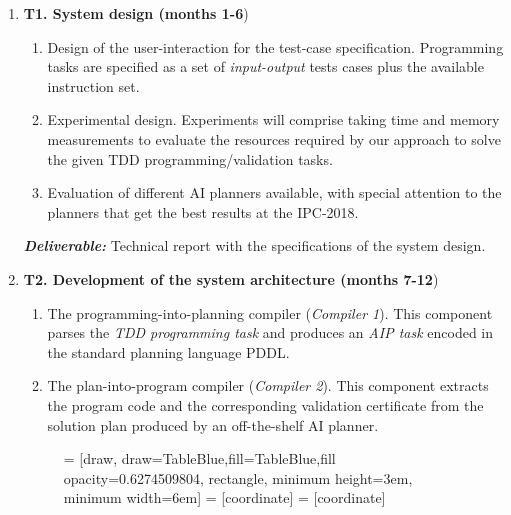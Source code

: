 \documentclass[10pt,a4paper]{paper}
\begin{document}
\begin{enumerate}
\item {\bf T1. System design (months 1-6})
  \begin{small}
    \begin{enumerate}
    \item Design of the user-interaction for the test-case specification. Programming tasks are specified as a set of {\em input-output} tests cases plus the available instruction set. 
    \item Experimental design. Experiments will comprise taking time and memory measurements to evaluate the resources required by our approach to solve the given TDD programming/validation tasks.
      \item Evaluation of different AI planners available, with special attention to the planners that get the best results at the IPC-2018. 
      \end{enumerate}
  \end{small}

{\small{\bf\em  Deliverable:} Technical report with the specifications of the system design.}
  
  \item {\bf T2. Development of the system architecture (months 7-12})
    \begin{small}
      \begin{enumerate}
      \item The programming-into-planning compiler ({\em Compiler 1}). This component parses the {\em TDD programming task} and produces an {\em AIP task} encoded in the standard planning language PDDL.
      \item The plan-into-program compiler ({\em Compiler 2}). This component extracts the program code and the corresponding validation certificate from the solution plan produced by an off-the-shelf AI planner.
      \end{enumerate}
\end{small}      

\begin{figure}[hbt!]
 = [draw, draw=TableBlue,fill=TableBlue,fill opacity=0.6274509804, rectangle, minimum height=3em, minimum width=6em]
 = [coordinate]
 = [coordinate]
\begin{center}
\end{center}
\end{figure}
\end{enumerate}
\end{document}
